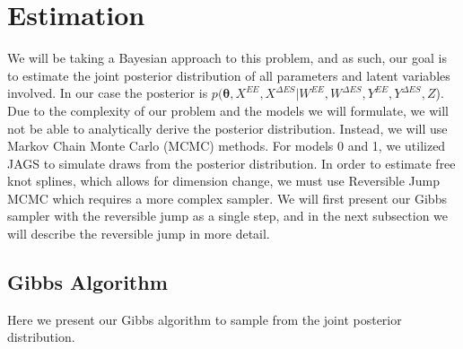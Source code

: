 \documentclass[11pt]{article}\usepackage[]{graphicx}\usepackage[]{color}
\begin{document}
% 
% 


\section{Estimation}

We will be taking a Bayesian approach to this problem, and as such, our goal is to estimate the joint  posterior distribution of all parameters and latent variables involved. In our case the posterior is  $p(\boldsymbol{\theta}, X^{EE},X^{\Delta ES}|W^{EE},W^{\Delta ES},Y^{EE},Y^{\Delta ES},Z$). Due to the complexity of our problem and the models we will formulate, we will not be able to analytically derive the posterior distribution. Instead, we will use Markov Chain Monte Carlo (MCMC) methods. For models 0 and 1, we utilized JAGS to simulate draws from the posterior distribution. In order to estimate free knot splines, which allows for dimension change, we must use Reversible Jump MCMC which requires a more complex sampler. We will first present our Gibbs sampler with the reversible jump as a single step, and in the next subsection we will describe the reversible jump in more detail.

\subsection{Gibbs Algorithm}
Here we present our Gibbs algorithm to sample from the joint posterior distribution.
\end{document}
